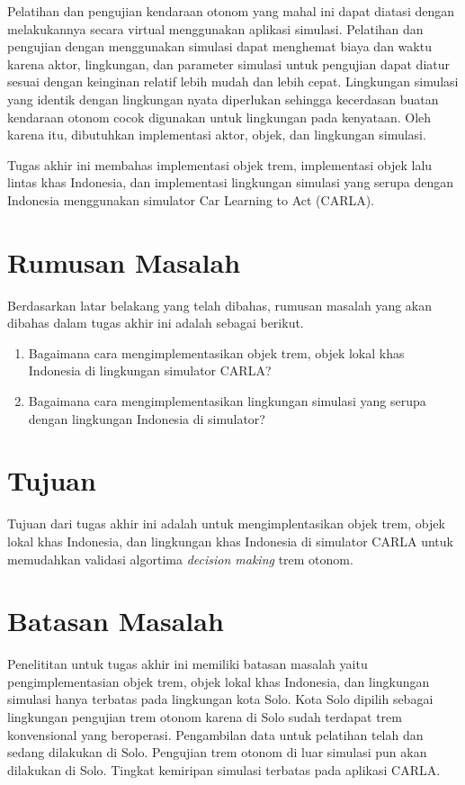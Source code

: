 Pelatihan dan pengujian kendaraan otonom yang mahal ini dapat diatasi dengan
melakukannya secara virtual menggunakan aplikasi simulasi. Pelatihan dan
pengujian dengan menggunakan simulasi dapat menghemat biaya dan waktu karena
aktor, lingkungan, dan parameter simulasi untuk pengujian dapat diatur sesuai
dengan keinginan relatif lebih mudah dan lebih cepat. Lingkungan simulasi yang
identik dengan lingkungan nyata diperlukan sehingga kecerdasan buatan kendaraan
otonom cocok digunakan untuk lingkungan pada kenyataan. Oleh karena itu,
dibutuhkan implementasi aktor, objek, dan lingkungan simulasi.

Tugas akhir ini membahas implementasi objek trem, implementasi objek lalu lintas
khas Indonesia, dan implementasi lingkungan simulasi yang serupa dengan
Indonesia menggunakan simulator Car Learning to Act (CARLA).

\section{Rumusan Masalah}

Berdasarkan latar belakang yang telah dibahas, rumusan masalah yang akan dibahas
dalam tugas akhir ini adalah sebagai berikut.
\begin{enumerate}
	\item Bagaimana cara mengimplementasikan objek trem, objek lokal khas
	Indonesia di lingkungan simulator CARLA?
	\item Bagaimana cara mengimplementasikan lingkungan simulasi yang serupa
	dengan lingkungan Indonesia di simulator?
\end{enumerate}

\section{Tujuan}

Tujuan dari tugas akhir ini adalah untuk mengimplentasikan objek trem, objek
lokal khas Indonesia, dan lingkungan khas Indonesia di simulator CARLA untuk
memudahkan validasi algortima \textit{decision making} trem otonom.

\section{Batasan Masalah}

Penelititan untuk tugas akhir ini memiliki batasan masalah yaitu
pengimplementasian objek trem, objek lokal khas Indonesia, dan lingkungan
simulasi hanya terbatas pada lingkungan kota Solo. Kota Solo dipilih sebagai
lingkungan pengujian trem otonom karena di Solo sudah terdapat trem konvensional
yang beroperasi. Pengambilan data untuk pelatihan telah dan sedang dilakukan di
Solo. Pengujian trem otonom di luar simulasi pun akan dilakukan di Solo.
Tingkat kemiripan simulasi terbatas pada aplikasi CARLA.

